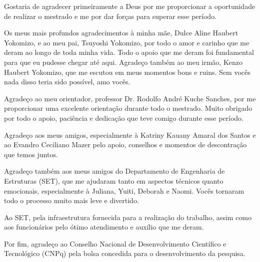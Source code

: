\begin{agradecimentos}

    Gostaria de agradecer primeiramente a Deus por me proporcionar a oportunidade de realizar o mestrado e me por dar forças para superar esse período.

    Os meus mais profundos agradecimentos à minha mãe, Dulce Aline Haubert Yokomizo, e ao meu pai, Tsuyoshi Yokomizo, por todo o amor e carinho que me deram ao longo de toda minha vida. Todo o apoio que me deram foi fundamental para que eu pudesse chegar até aqui. Agradeço também ao meu irmão, Kenzo Haubert Yokomizo, que me escutou em meus momentos bons e ruins. Sem vocês nada disso teria sido possível, amo vocês.

    Agradeço ao meu orientador, professor Dr. Rodolfo André Kuche Sanches, por me proporcionar uma excelente orientação durante todo o mestrado. Muito obrigado por todo o apoio, paciência e dedicação que teve comigo durante esse período.

    Agradeço aos meus amigos, especialmente à Katriny Kauany Amaral dos Santos e ao Evandro Ceciliano Mazer pelo apoio, conselhos e momentos de descontração que temos juntos.

    Agradeço também aos meus amigos do Departamento de Engenharia de Estruturas (SET), que me ajudaram tanto em aspectos técnicos quanto emocionais, especialmente à Juliana, Yuiti, Deborah e Naomi. Vocês tornaram todo o processo muito mais leve e divertido.

    Ao SET, pela infraestrutura fornecida para a realização do trabalho, assim como aos funcionários pelo ótimo atendimento e auxílio que me deram.

    Por fim, agradeço ao Conselho Nacional de Desenvolvimento Científico e Tecnológico (CNPq) pela bolsa concedida para o desenvolvimento da pesquisa.

\end{agradecimentos}